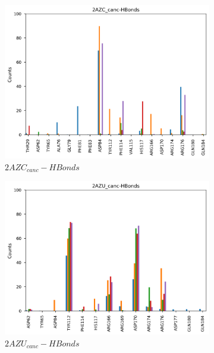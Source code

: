 \documentclass[fleqn,10pt]{wlscirep}
\begin{document}
\begin{figure}[!ht]
\centering
   \begin{subfigure}{.45\textwidth}
     \centering
     \includegraphics[width=.95\linewidth]{2AZC_canc/2AZC_canc-HBonds.png}
     \caption{$2AZC_{canc}-HBonds$}
     \label{fig:2AZC_canc-HBonds}
   \end{subfigure}
   \begin{subfigure}{.45\textwidth}
     \centering
     \includegraphics[width=.95\linewidth]{2AZU_canc/2AZU_canc-HBonds.png}
     \caption{$2AZU_{canc}-HBonds$}
     \label{fig:2AZU_canc-HBonds}
   \end{subfigure}
   \\
   \begin{subfigure}{.45\textwidth}
     \centering

\end{subfigure}
\end{figure}
\end{document}
